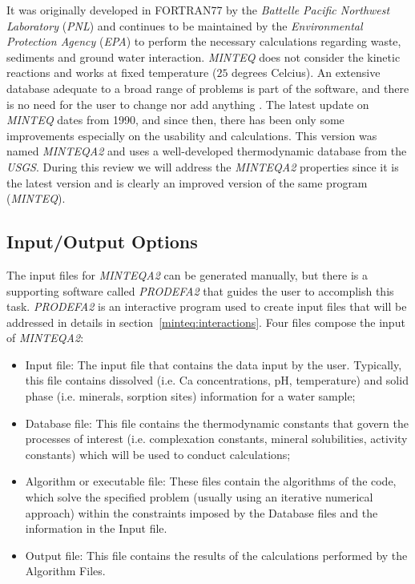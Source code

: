 It was originally developed in FORTRAN77 by the \emph{Battelle Pacific Northwest Laboratory} (\emph{PNL}) and continues to be maintained by the \emph{Environmental Protection Agency} (\emph{EPA}) to perform the  necessary calculations regarding waste, sediments and ground water interaction. \emph{MINTEQ} does not consider the kinetic reactions and works at fixed temperature ($25$ degrees Celcius). 
An extensive database adequate to a broad range of problems is part of the software, and there is no need for the user to change nor add anything \cite{Brown:87} \cite{Allison:91}. The latest update on \emph{MINTEQ} dates from 1990, and since then, there has been only some improvements especially on the usability and calculations. This version was named \emph{MINTEQA2} and uses a well-developed thermodynamic database from the \emph{USGS}. During this review we will address the \emph{MINTEQA2} properties since it is the latest version and is clearly an improved version of the same program (\emph{MINTEQ}).

\subsection{Input/Output Options}
The input files for \emph{MINTEQA2} can be generated manually, but there is a supporting software called \emph{PRODEFA2} that guides the user to accomplish this task. \emph{PRODEFA2} is an interactive program used to create input files that will be addressed in details in section~\ref{minteq:interactions}. Four files compose the input of \emph{MINTEQA2}:
\begin{itemize}
\item Input file: The input file that contains the data input by the user. Typically, this file contains dissolved (i.e. Ca concentrations, pH, temperature) and solid phase (i.e. minerals, sorption sites) information for a water sample;
\item Database file: This file contains the thermodynamic constants that govern the processes of interest (i.e. complexation constants, mineral solubilities, activity constants) which will be used to conduct calculations;
\item Algorithm or executable file:  These files contain the algorithms of the code, which solve the specified problem (usually using an iterative numerical approach) within the constraints imposed by the Database files and the information in the Input file.
\item Output file: This file contains the results of the calculations performed by the Algorithm Files.
\end{itemize}

